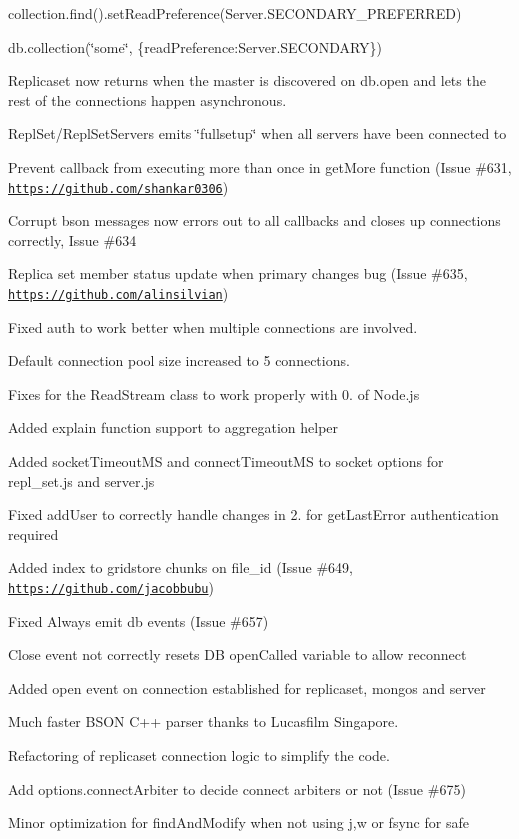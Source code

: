 \begin{DoxyItemize}
\begin{DoxyItemize}
\item collection.\+find().set\+Read\+Preference(Server.\+S\+E\+C\+O\+N\+D\+A\+R\+Y\+\_\+\+P\+R\+E\+F\+E\+R\+R\+ED)
\item db.\+collection(\char`\"{}some\char`\"{}, \{read\+Preference\+:Server.\+S\+E\+C\+O\+N\+D\+A\+RY\})
\end{DoxyItemize}
\item Replicaset now returns when the master is discovered on db.\+open and lets the rest of the connections happen asynchronous.
\begin{DoxyItemize}
\item Repl\+Set/\+Repl\+Set\+Servers emits \char`\"{}fullsetup\char`\"{} when all servers have been connected to
\end{DoxyItemize}
\item Prevent callback from executing more than once in get\+More function (Issue \#631, \href{https://github.com/shankar0306}{\tt https\+://github.\+com/shankar0306})
\item Corrupt bson messages now errors out to all callbacks and closes up connections correctly, Issue \#634
\item Replica set member status update when primary changes bug (Issue \#635, \href{https://github.com/alinsilvian}{\tt https\+://github.\+com/alinsilvian})
\item Fixed auth to work better when multiple connections are involved.
\item Default connection pool size increased to 5 connections.
\item Fixes for the Read\+Stream class to work properly with 0. of Node.\+js
\item Added explain function support to aggregation helper
\item Added socket\+Timeout\+MS and connect\+Timeout\+MS to socket options for repl\+\_\+set.\+js and server.\+js
\item Fixed add\+User to correctly handle changes in 2. for get\+Last\+Error authentication required
\item Added index to gridstore chunks on file\+\_\+id (Issue \#649, \href{https://github.com/jacobbubu}{\tt https\+://github.\+com/jacobbubu})
\item Fixed Always emit db events (Issue \#657)
\item Close event not correctly resets DB open\+Called variable to allow reconnect
\item Added open event on connection established for replicaset, mongos and server
\item Much faster B\+S\+ON C++ parser thanks to Lucasfilm Singapore.
\item Refactoring of replicaset connection logic to simplify the code.
\item Add {\ttfamily options.\+connect\+Arbiter} to decide connect arbiters or not (Issue \#675)
\item Minor optimization for find\+And\+Modify when not using j,w or fsync for safe
\end{DoxyItemize}

